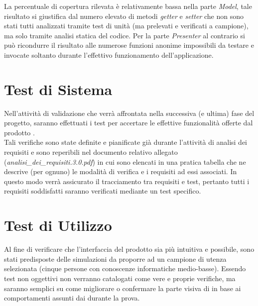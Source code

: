 La percentuale di copertura rilevata è relativamente bassa nella parte \textit{Model}, tale risultato si giustifica dal numero elevato di metodi \textit{getter} e \textit{setter} che non sono stati tutti analizzati tramite test di unità (ma prelevati e verificati a campione), ma solo tramite analisi statica del codice. Per la parte \textit{Presenter} al contrario si può ricondurre il risultato alle numerose funzioni anonime impossibili da testare e invocate soltanto durante l'effettivo funzionamento dell'applicazione.

\section{Test di Sistema}
Nell'attività di validazione che verrà affrontata nella successiva (e ultima) fase del progetto, saranno effettuati i test per accertare le effettive funzionalità offerte dal prodotto \caName.\\ Tali verifiche sono state definite e pianificate già durante l'attività di analisi dei requisiti e sono reperibili nel documento relativo allegato (\textit{analisi\_dei\_requisiti.3.0.pdf}) in cui sono elencati in una pratica tabella che ne descrive (per ognuno) le modalità di verifica e i requisiti ad essi associati. In questo modo verrà assicurato il tracciamento tra requisiti e test, pertanto tutti i requisiti soddisfatti saranno verificati mediante un test specifico.

\section{Test di Utilizzo}
Al fine di verificare che l'interfaccia del prodotto sia più intuitiva e  possibile, sono stati predisposte delle simulazioni da proporre ad un campione di utenza selezionata (cinque persone con conoscenze informatiche medio-basse).
Essendo test non oggettivi non verranno catalogati come vere e proprie verifiche, ma saranno semplici  su come migliorare o confermare la parte visiva di \caName in base ai comportamenti assunti dai  durante la prova.
